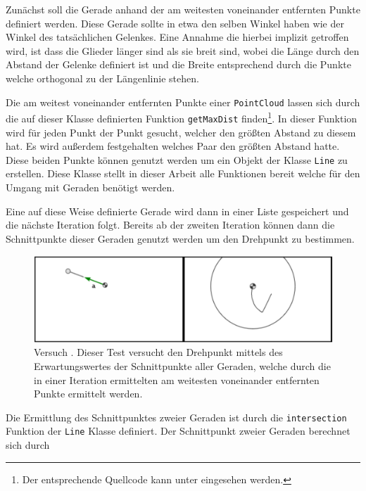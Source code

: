 Zunächst soll die Gerade anhand der am weitesten voneinander entfernten Punkte definiert werden.
Diese Gerade sollte in etwa den selben Winkel haben wie der Winkel des tatsächlichen Gelenkes.
Eine Annahme die hierbei implizit getroffen wird, ist dass die Glieder länger sind als sie breit sind, wobei die Länge durch den Abstand der Gelenke definiert ist und die Breite entsprechend durch die Punkte welche orthogonal zu der Längenlinie stehen.

Die am weitest voneinander entfernten Punkte einer \lstinline{PointCloud} lassen sich durch die auf dieser Klasse definierten Funktion \lstinline{getMaxDist} finden\footnote{Der entsprechende Quellcode kann unter  eingesehen werden.}.
In dieser Funktion wird für jeden Punkt der Punkt gesucht, welcher den grö{\ss}ten Abstand zu diesem hat. Es wird au{\ss}erdem festgehalten welches Paar den grö{\ss}ten Abstand hatte.
Diese beiden Punkte können genutzt werden um ein Objekt der Klasse \lstinline{Line} zu erstellen.
Diese Klasse stellt in dieser Arbeit alle Funktionen bereit welche für den Umgang mit Geraden benötigt werden.

Eine auf diese Weise definierte Gerade wird dann in einer Liste gespeichert und die nächste Iteration folgt.
Bereits ab der zweiten Iteration können dann die Schnittpunkte dieser Geraden genutzt werden um den Drehpunkt zu bestimmen.

\begin{figure}
    \centering
    \includegraphics[width=\textwidth]{gfx/pendel1_3.png} %
    \caption[Versuch ]{Versuch . Dieser Test versucht den Drehpunkt mittels des Erwartungswertes der Schnittpunkte aller Geraden, welche durch die in einer Iteration ermittelten am weitesten voneinander entfernten Punkte ermittelt werden.}
    \label{fig:pendel2_1}
\end{figure}

Die Ermittlung des Schnittpunktes zweier Geraden ist durch die \lstinline{intersection} Funktion der \lstinline{Line} Klasse definiert.
Der Schnittpunkt zweier Geraden berechnet sich durch

